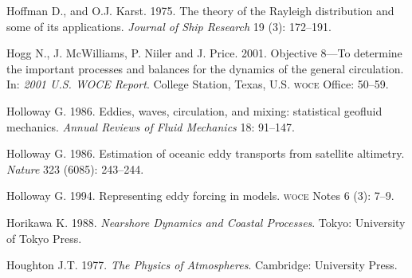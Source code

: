 \begin{thebibliography}{999}
Hoffman D., and O.J. Karst.  1975. The theory of the Rayleigh
distribution and some of its applications. \textit{Journal of Ship
  Research} 19 (3): 172--191.
%

Hogg N., J. McWilliams, P. Niiler and J. Price.  2001. Objective
8---To determine the important processes and balances for the dynamics
of the general circulation. In: \textit{2001 U.S. WOCE
  Report}. College Station, Texas, U.S. \textsc{woce} Office: 50--59.
%

Holloway G.  1986. Eddies, waves, circulation, and mixing: statistical
geofluid mechanics. \textit{Annual Reviews of Fluid Mechanics} 18:
91--147.
%

Holloway G.  1986. Estimation of oceanic eddy transports from
satellite altimetry. \textit{Nature} 323 (6085): 243--244.
%

Holloway G.  1994. Representing eddy forcing in models. \textsc{woce}
Notes 6 (3): 7--9.
%

Horikawa K.  1988. \textit{Nearshore Dynamics and Coastal Processes}.
Tokyo: University of Tokyo Press.
%

Houghton J.T.  1977. \textit{The Physics of Atmospheres}. Cambridge:
University Press.
%


\end{thebibliography}
